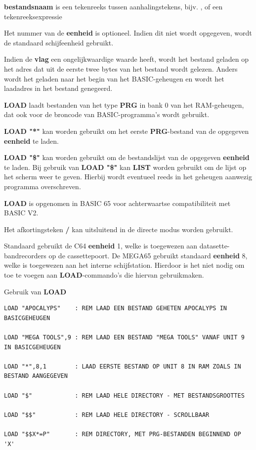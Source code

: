 \begin{description}[leftmargin=2cm,style=nextline]
                  {\bf bestandsnaam} is een tekenreeks tussen aanhalingstekens, bijv. , of een tekenreeksexpressie 

                  Het nummer van de {\bf eenheid} is optioneel. Indien dit niet wordt opgegeven, wordt de standaard schijfeenheid gebruikt.

                  Indien de {\bf vlag} een ongelijkwaardige waarde heeft, wordt het bestand geladen op het adres dat uit de eerste twee bytes van het bestand wordt gelezen. Anders wordt het geladen naar het begin van het BASIC-geheugen en wordt het laadadres in het bestand genegeerd.

\item [Opmerkingen:]  {\bf LOAD} laadt bestanden van het type {\bf PRG} in bank 0 van het RAM-geheugen, dat ook voor de broncode van BASIC-programma's wordt gebruikt.

                  {\bf LOAD "*"} kan worden gebruikt om het eerste {\bf PRG}-bestand van de opgegeven {\bf eenheid} te laden.

                  {\bf LOAD "\$"} kan worden gebruikt om de bestandslijst van de opgegeven {\bf eenheid} te laden. Bij gebruik van {\bf LOAD "\$"} kan {\bf LIST} worden gebruikt om de lijst op het scherm weer te geven. Hierbij wordt eventueel reeds in het geheugen aanwezig programma overschreven.

                  {\bf LOAD} is opgenomen in BASIC 65 voor achterwaartse compatibiliteit met BASIC V2.

                  Het afkortingsteken {\bf /} kan uitsluitend in de directe modus worden gebruikt.

                  Standaard gebruikt de C64 {\bf eenheid} 1, welke is toegewezen aan datasette-bandrecorders op de cassettepoort. De MEGA65 gebruikt standaard {\bf eenheid} 8, welke is toegewezen aan het interne schijfstation. Hierdoor is het niet nodig om  toe te voegen aan {\bf LOAD}-commando's die hiervan gebruikmaken.

\item [Voorbeelden:] Gebruik van {\bf LOAD}

\begin{tcolorbox}[colback=black,coltext=white]
\verbatimfont{\codefont}
\begin{verbatim}
LOAD "APOCALYPS"    : REM LAAD EEN BESTAND GEHETEN APOCALYPS IN BASICGEHEUGEN

LOAD "MEGA TOOLS",9 : REM LAAD EEN BESTAND "MEGA TOOLS" VANAF UNIT 9 IN BASICGEHEUGEN

LOAD "*",8,1        : LAAD EERSTE BESTAND OP UNIT 8 IN RAM ZOALS IN BESTAND AANGEGEVEN

LOAD "$"            : REM LAAD HELE DIRECTORY - MET BESTANDSGROOTTES

LOAD "$$"           : REM LAAD HELE DIRECTORY - SCROLLBAAR

LOAD "$$X*=P"       : REM DIRECTORY, MET PRG-BESTANDEN BEGINNEND OP 'X'
\end{verbatim}
\end{tcolorbox}
\end{description}

